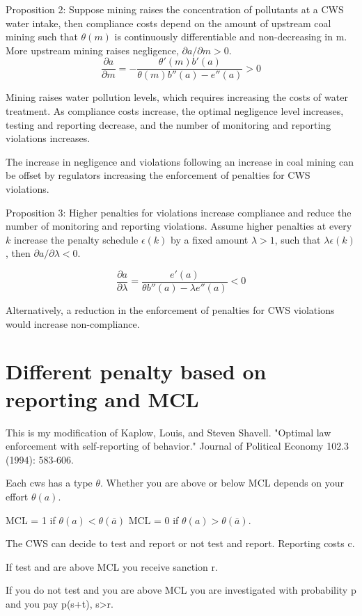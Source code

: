\documentclass{article}
\begin{document}
Proposition 2: Suppose mining raises the concentration of pollutants at a CWS water intake, then compliance costs depend on the amount of upstream coal mining such that $\theta (m)$ is continuously differentiable and non-decreasing in m. More upstream mining raises negligence, $\partial a/\partial m >0$.
\[\frac{\partial a}{\partial m}=-\frac{\theta'(m)b'(a)}{\theta(m) b''(a)-e''(a)}>0\]

Mining raises water pollution levels, which requires increasing the costs of water treatment. As compliance costs increase, the optimal negligence level increases, testing and reporting decrease, and the number of monitoring and reporting violations increases. 

The increase in negligence and violations following an increase in coal mining can be offset by regulators increasing the enforcement of penalties for CWS violations.

Proposition 3: Higher penalties for violations increase compliance and reduce the number of monitoring and reporting violations. Assume higher penalties at every $k$ increase the penalty schedule $\epsilon(k)$ by a fixed amount $\lambda>1$, such that $\lambda\epsilon(k)$, then $\partial a/\partial \lambda<0$.

\[\frac{\partial a}{\partial \lambda}=\frac{e'(a)}{\theta b''(a)-\lambda e''(a)}<0\]

Alternatively, a reduction in the enforcement of penalties for CWS violations would increase non-compliance.

\section{Different penalty based on reporting and MCL}

This is my modification of Kaplow, Louis, and Steven Shavell. "Optimal law enforcement with self-reporting of behavior." Journal of Political Economy 102.3 (1994): 583-606.

Each cws has a type $\theta$. Whether you are above or below MCL depends on your effort $\theta(a)$.

MCL = 1 if $\theta(a)<\theta(\bar{a})$
MCL = 0 if $\theta(a)>\theta(\bar{a})$.

The CWS can decide to test and report or not test and report. Reporting costs c.

If test and are above MCL you receive sanction r. 

If you do not test and you are above MCL you are investigated with probability p and you pay p(s+t), s>r.
\end{document}
